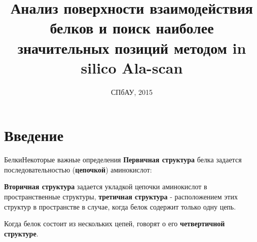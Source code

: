 \documentclass[12pt, xcolor={dvipsnames}]{beamer}
\title[] %
{Анализ поверхности взаимодействия белков и поиск наиболее значительных позиций методом in silico Ala-scan}
\author[] %
{
  \texorpdfstring{
	\begin{columns}
	\column{.55\linewidth}
		Магистрант:\\
		Научный руководитель:
	\column{.45\linewidth}
		Татьяна Малыгина, СПбАУ\\
		Павел Яковлев, BIOCAD
	\end{columns}
   }
   {\& }
}
\date[DIPLOMA 2015] %
{СПбАУ, 2015}
\begin{document}
\begin{frame}
  \titlepage
\end{frame}
\section{Введение}
\begin{frame}{Белки}{Некоторые важные определения}
\textbf{Первичная структура} белка задается последовательностью (\textbf{цепочкой}) аминокислот:


\textbf{Вторичная структура} задается укладкой цепочки аминокислот в пространственные структуры, \textbf{третичная структура} - расположением этих структур в пространстве в случае, когда белок содержит только одну цепь.

Когда белок состоит из нескольких цепей, говорят о его \textbf{четвертичной структуре}.
\end{frame}
\end{document}
